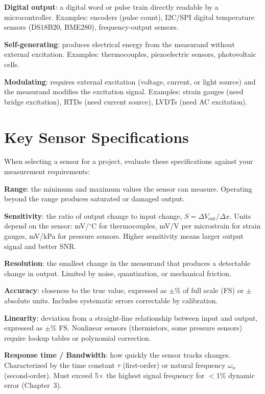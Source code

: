 \documentclass[11pt,letterpaper,twoside,openany]{book}
\newcommand{\degC}{\ensuremath{{}^{\circ}\text{C}}}
\begin{document}
\textbf{Digital output}: a digital word or pulse train directly readable by a microcontroller. Examples: encoders (pulse count), I2C/SPI digital temperature sensors (DS18B20, BME280), frequency-output sensors.

\textbf{Self-generating}: produces electrical energy from the measurand without external excitation. Examples: thermocouples, piezoelectric sensors, photovoltaic cells.

\textbf{Modulating}: requires external excitation (voltage, current, or light source) and the measurand modifies the excitation signal. Examples: strain gauges (need bridge excitation), RTDs (need current source), LVDTs (need AC excitation).

\section{Key Sensor Specifications}

When selecting a sensor for a project, evaluate these specifications against your measurement requirements:

\textbf{Range}: the minimum and maximum values the sensor can measure. Operating beyond the range produces saturated or damaged output.

\textbf{Sensitivity}: the ratio of output change to input change, $S = \Delta V_{\text{out}} / \Delta x$. Units depend on the sensor: mV/\degC{} for thermocouples, mV/V per microstrain for strain gauges, mV/kPa for pressure sensors. Higher sensitivity means larger output signal and better SNR.

\textbf{Resolution}: the smallest change in the measurand that produces a detectable change in output. Limited by noise, quantization, or mechanical friction.

\textbf{Accuracy}: closeness to the true value, expressed as $\pm$\% of full scale (FS) or $\pm$ absolute units. Includes systematic errors correctable by calibration.

\textbf{Linearity}: deviation from a straight-line relationship between input and output, expressed as $\pm$\% FS. Nonlinear sensors (thermistors, some pressure sensors) require lookup tables or polynomial correction.

\textbf{Response time / Bandwidth}: how quickly the sensor tracks changes. Characterized by the time constant $\tau$ (first-order) or natural frequency $\omega_n$ (second-order). Must exceed 5$\times$ the highest signal frequency for $<$1\% dynamic error (Chapter~3).
\end{document}
